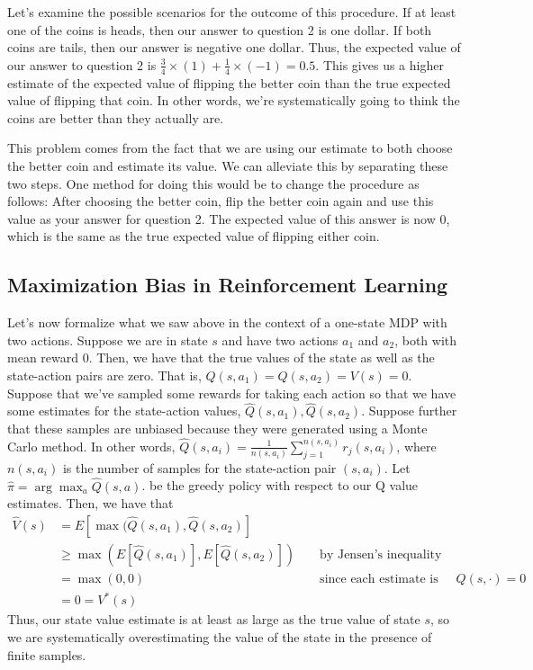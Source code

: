 \documentclass{article}
\theoremstyle{definition}
\theoremstyle{remark}
\begin{document}
Let's examine the possible scenarios for the outcome of this procedure.  If at least one of the coins is heads, then our answer to question 2 is one dollar.  If both coins are tails, then our answer is negative one dollar.  Thus, the expected value of our answer to question 2 is $\frac{3}{4} \times (1) + \frac{1}{4} \times (-1) = 0.5$.  This gives us a higher estimate of the expected value of flipping the better coin than the true expected value of flipping that coin.  In other words, we're systematically going to think the coins are better than they actually are.

This problem comes from the fact that we are using our estimate to both choose the better coin and estimate its value.  We can alleviate this by separating these two steps.  One method for doing this would be to change the procedure as follows:  After choosing the better coin, flip the better coin again and use this value as your answer for question 2.  The expected value of this answer is now 0, which is the same as the true expected value of flipping either coin.

\subsection{Maximization Bias in Reinforcement Learning}
Let's now formalize what we saw above in the context of a one-state MDP with two actions.  Suppose we are in state $s$ and have two actions $a_1$ and $a_2$, both with mean reward 0.  Then, we have that the true values of the state as well as the state-action pairs are zero.  That is, $Q(s, a_1) = Q(s, a_2) = V(s) = 0$.  Suppose that we've sampled some rewards for taking each action so that we have some estimates for the state-action values, $\hat{Q}(s, a_1), \hat{Q}(s, a_2)$.  Suppose further that these samples are unbiased because they were generated using a Monte Carlo method.  In other words, $\hat{Q}(s,a_i) = \frac{1}{n(s,a_i)}\sum_{j=1}^{n(s,a_i)} r_j(s,a_i)$, where $n(s,a_i)$ is the number of samples for the state-action pair $(s,a_i)$.  Let $\hat{\pi} = \arg\max_a \hat{Q}(s,a)$. be the greedy policy with respect to our Q value estimates.  Then, we have that
\begin{align*}
\hat{V}(s) &= E[\max(\hat{Q}(s,a_1), \hat{Q}(s,a_2)] \\
	&\geq \max(E[\hat{Q}(s,a_1)], E[\hat{Q}(s,a_2)]) &&\text{ by Jensen's inequality} \\
	&= \max(0,0) &&\text{ since each estimate is unbiased and $Q(s, \cdot)=0$} \\
	&= 0 = V^*(s)
\end{align*}
Thus, our state value estimate is at least as large as the true value of state $s$, so we are systematically overestimating the value of the state in the presence of finite samples.
\end{document}
